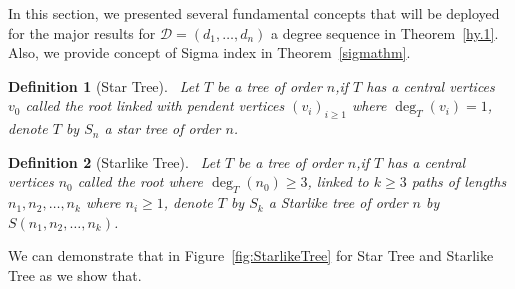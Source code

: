 \documentclass[12pt]{amsart}
\newtheorem{definition}{Definition}
\begin{document}
In this section, we presented several fundamental concepts that will be deployed for the major results for $\mathscr{D}=(d_1,\dots,d_n)$ a degree sequence in Theorem~\ref{hy.1}. Also, we provide concept of Sigma index in Theorem~\ref{sigmathm}.
\begin{definition}[Star Tree]~\label{StardefTree}
Let $T$ be a tree of order $n$,if $T$ has a central vertices $v_0$ called the root linked with pendent vertices $(v_i)_{i\geq 1}$ where $\deg_T(v_i)=1$, denote $T$ by $S_n$ a star tree of order $n$. 
\end{definition}
\begin{definition}[Starlike Tree]~\label{StarlikedefTree}
Let $T$ be a tree of order $n$,if $T$ has a central vertices $n_0$ called the root where $\deg_T(n_0)\geqslant 3$, linked to $k\geqslant 3$ paths of lengths $n_1,n_2,\dots,n_k$ where $n_i\geq 1$, denote $T$ by $S_k$ a Starlike tree of order $n$ by $S(n_1,n_2,\dots,n_k)$. 
\end{definition}
We can demonstrate that in Figure~\ref{fig:StarlikeTree} for Star Tree and Starlike Tree as we show that.
\end{document}
